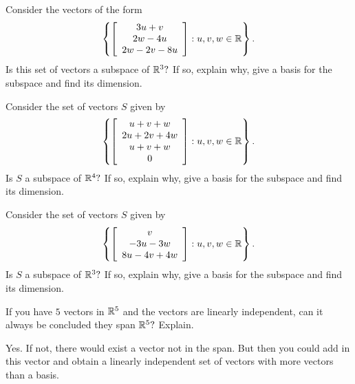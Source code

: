 \begin{enumialphparenastyle}
\begin{ex} Consider the vectors of the form 
\begin{equation*}
\left\{ \left[ 
\begin{array}{c}
3u+v \\ 
2w-4u \\ 
2w-2v-8u
\end{array}
\right] :u,v,w\in \mathbb{R}\right\} .
\end{equation*}
Is this set of vectors a subspace of $\mathbb{R}^{3}?$ If so, explain why,
give a basis for the subspace and find its dimension.
\end{ex}

\begin{ex} Consider the set of vectors $S$ given by  
\begin{equation*}
\left\{ \left[ 
\begin{array}{c}
u+v+w \\ 
2u+2v+4w \\ 
u+v+w \\ 
0
\end{array}
\right] :u,v,w\in \mathbb{R}\right\} .
\end{equation*}
Is $S$ a subspace of $\mathbb{R}^{4}?$ If so, explain why,
give a basis for the subspace and find its dimension.
\end{ex}

\begin{ex} Consider the set of vectors $S$ given by  
\begin{equation*}
\left\{ \left[ 
\begin{array}{c}
v \\ 
-3u-3w \\ 
8u-4v+4w
\end{array}
\right] :u,v,w\in \mathbb{R}\right\} .
\end{equation*}
Is $S$ a subspace of $\mathbb{R}^{3}?$ If so, explain why,
give a basis for the subspace and find its dimension.
\end{ex}

\begin{ex} If you have $5$ vectors in $\mathbb{R}^{5}$ and the vectors are
linearly independent, can it always be concluded they span $\mathbb{R}^{5}?$
Explain. 
\begin{sol}
 Yes. If not, there would exist a vector not in the span. But then
you could add in this vector and obtain a linearly independent set of
vectors with more vectors than a basis.
\end{sol}
\end{ex}


\end{enumialphparenastyle}
